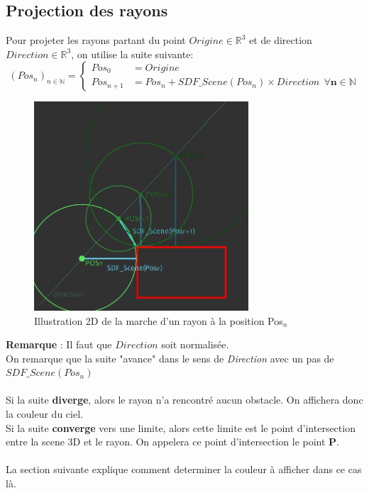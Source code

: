 \subsection{Projection des rayons}
\label{subsec:projection}
Pour projeter les rayons partant du point $Origine\in \mathbb{R}^3$ et de direction $Direction\in \mathbb{R}^3$, on utilise la suite suivante:
$$
(Pos_n)_{n\in \mathbb{N}}=\left\{
    \begin{array}{ll}
        Pos_0 &= Origine \\
        Pos_{n+1} &= Pos_n + SDF\_Scene(Pos_n)\times Direction \ \ \mathbf{\forall n\in \mathbb{N}}
    \end{array}
\right.
$$

\begin{figure}[h]
    \centering
    \includegraphics[width=8cm]{images/ProjectionDesRayons.jpg}
    \caption{Illustration 2D de la marche d'un rayon à la position Pos$_n$ }
    \label{fig:my_label}
\end{figure}

\textbf{Remarque} : Il faut que $Direction$ soit normalisée. \\
On remarque que la suite "avance" dans le sens de \emph{Direction} avec un pas de $SDF\_Scene(Pos_n)$\\
\\
Si la suite \textbf{diverge}, alors le rayon n'a rencontré aucun obstacle. On affichera donc la couleur du ciel.\\
Si la suite \textbf{converge} vers une limite, alors cette limite est le point d'intersection entre la scene 3D et le rayon. On appelera ce point d'intersection le point \textbf{P}.\\
\\
La section suivante explique comment determiner la couleur à afficher dans ce cas là.